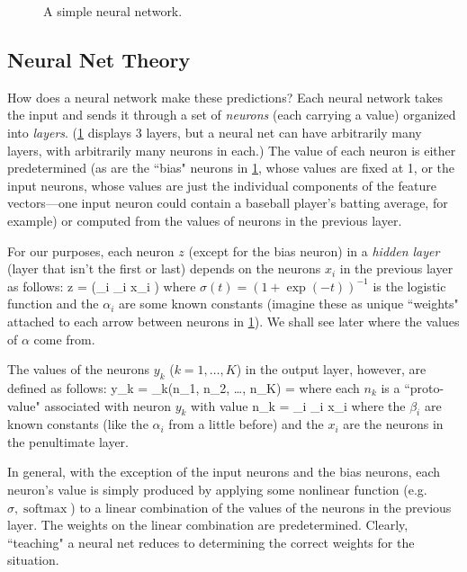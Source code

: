 \documentclass{article}
\DeclareMathOperator{\softmax}{softmax}
\begin{document}
\begin{figure}[htbp]
\centering

\caption{A simple neural network.}
\label{fig:neuralnet}
\end{figure}


\subsection{Neural Net Theory}

How does a neural network make these predictions?
Each neural network takes the input and sends it through a set of \emph{neurons} (each carrying a value) organized into \emph{layers}.
(\cref{fig:neuralnet} displays 3 layers, but a neural net can have arbitrarily many layers, with arbitrarily many neurons in each.)
The value of each neuron is either predetermined (as are the ``bias" neurons in \cref{fig:neuralnet}, whose values are fixed at 1, or the input neurons, whose values are just the individual components of the feature vectors---one input neuron could contain a baseball player's batting average, for example) or computed from the values of neurons in the previous layer.

For our purposes, each neuron $z$ (except for the bias neuron) in a \emph{hidden layer} (layer that isn't the first or last) depends on the neurons $x_i$ in the previous layer as follows:
\beq
\label{eq:hiddenlayer}
z = \sigma\left(\sum_i \alpha_i x_i \right)
\eeq
where $\sigma(t) = (1 + \exp(-t))^{-1}$ is the logistic function and the $\alpha_i$ are some known constants (imagine these as unique ``weights" attached to each arrow between neurons in \cref{fig:neuralnet}). We shall see later where the values of $\alpha$ come from.

The values of the neurons $y_k$ ($k = 1, \dots, K$) in the output layer, however, are defined as follows:
\beq
y_k = \softmax_k(n_1, n_2, \dots, n_K) = 
\eeq
where each $n_k$ is a ``proto-value" associated with neuron $y_k$ with value
\beq
\label{eq:netvalue}
n_k = \sum_i \beta_i x_i
\eeq
where the $\beta_i$ are known constants (like the $\alpha_i$ from a little before) and the $x_i$ are the neurons in the penultimate layer.

In general, with the exception of the input neurons and the bias neurons, each neuron's value is simply produced by applying some nonlinear function (e.g. $\sigma, \softmax$) to a linear combination of the values of the neurons in the previous layer. The weights on the linear combination are predetermined. Clearly, ``teaching" a neural net reduces to determining  the correct weights for the situation.
\end{document}
